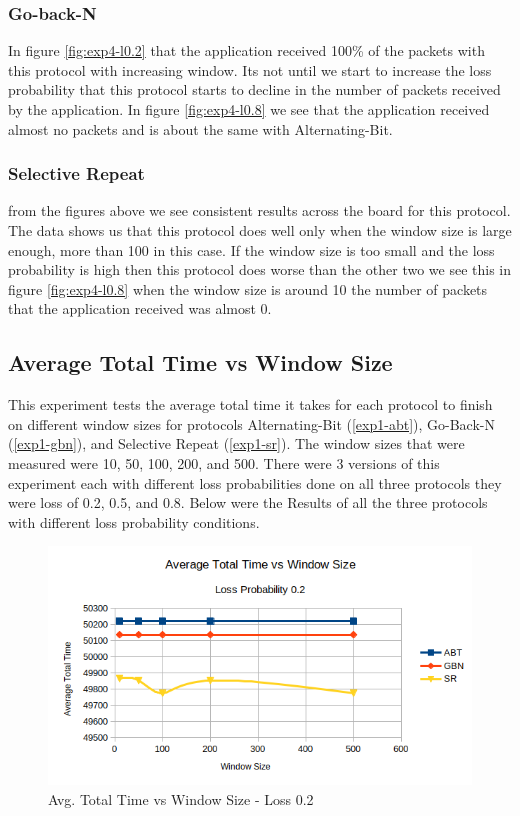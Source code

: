 \documentclass[10pt, a4paper]{article}
\begin{document}
    \subsubsection{Go-back-N}
    
	    In figure \ref{fig:exp4-l0.2} that the application received 100\% of the packets with this protocol with increasing window. Its not until we start to increase the loss probability that this protocol starts to decline in the number of packets received by the application. In figure \ref{fig:exp4-l0.8} we see that the application received almost no packets and is about the same with Alternating-Bit.
	    
    \subsubsection{Selective Repeat}
    
    	from the figures above we see consistent results across the board for this protocol. The data shows us that this protocol does well only when the window size is large enough, more than 100 in this case. If the window size is too small and the loss probability is high then this protocol does worse than the other two we see this in figure \ref{fig:exp4-l0.8} when the window size is around 10 the number of packets that the application received was almost 0. 

  \subsection{Average Total Time vs Window Size\label{exp5}}
  
    This experiment tests the average total time it takes for each protocol to finish on different window sizes for protocols Alternating-Bit (\ref{exp1-abt}), Go-Back-N (\ref{exp1-gbn}), and Selective Repeat (\ref{exp1-sr}). The window sizes that were measured were 10, 50, 100, 200, and 500. There were 3 versions of this experiment each with different loss probabilities done on all three protocols they were loss of 0.2, 0.5, and 0.8. Below were the Results of all the three protocols with different loss probability conditions. 
    
    \begin{figure}[H]
        \includegraphics[width=\textwidth]{exp5-l02.png}
        \centering
        \caption{Avg. Total Time vs Window Size - Loss 0.2 }
        \label{fig:exp5-l0.2}
    \end{figure}
      
\end{document}

